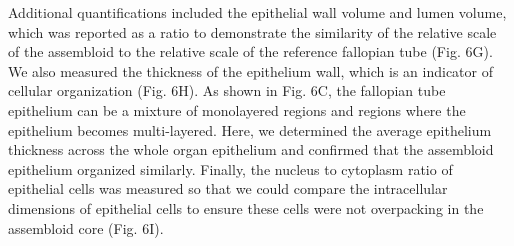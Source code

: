 \begin{refsection}
    Additional quantifications included the epithelial wall volume and lumen volume, which was reported as a ratio to demonstrate the similarity of the relative scale of the assembloid to the relative scale of the reference fallopian tube (Fig. 6G). We also measured the thickness of the epithelium wall, which is an indicator of cellular organization (Fig. 6H). As shown in Fig. 6C, the fallopian tube epithelium can be a mixture of monolayered regions and regions where the epithelium becomes multi-layered. Here, we determined the average epithelium thickness across the whole organ epithelium and confirmed that the assembloid epithelium organized similarly. Finally, the nucleus to cytoplasm ratio of epithelial cells was measured so that we could compare the intracellular dimensions of epithelial cells to ensure these cells were not overpacking in the assembloid core (Fig. 6I).

\end{refsection}
